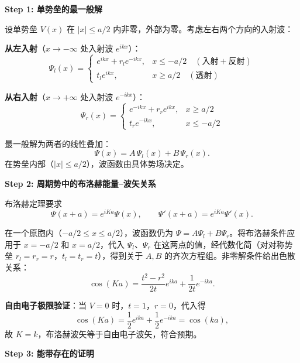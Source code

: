 \begin{derivationbox}[标准解题过程]
\textbf{Step 1: 单势垒的最一般解}

设单势垒 $V(x)$ 在 $|x|\le a/2$ 内非零，外部为零。考虑左右两个方向的入射波：

\textbf{从左入射}（$x\to-\infty$ 处入射波 $e^{ikx}$）：
\begin{equation}
\Psi_l(x)=\begin{cases}
e^{ikx}+r_l e^{-ikx}, & x\le -a/2 \quad(\text{入射}+\text{反射})\\
t_l e^{ikx}, & x\ge a/2 \quad(\text{透射})
\end{cases}
\end{equation}

\textbf{从右入射}（$x\to+\infty$ 处入射波 $e^{-ikx}$）：
\begin{equation}
\Psi_r(x)=\begin{cases}
e^{-ikx}+r_r e^{ikx}, & x\ge a/2 \\
t_r e^{-ikx}, & x\le -a/2
\end{cases}
\end{equation}

最一般解为两者的线性叠加：
\begin{equation}
\boxed{\Psi(x)=A\,\Psi_l(x)+B\,\Psi_r(x).}
\end{equation}
在势垒内部（$|x|\le a/2$），波函数由具体势场决定。

\textbf{Step 2: 周期势中的布洛赫能量--波矢关系}

布洛赫定理要求
\begin{equation}
\Psi(x+a)=e^{iKa}\Psi(x),\qquad \Psi'(x+a)=e^{iKa}\Psi'(x).
\end{equation}

在一个原胞内（$-a/2\le x\le a/2$），波函数仍为 $\Psi=A\Psi_l+B\Psi_r$。将布洛赫条件应用于 $x=-a/2$ 和 $x=a/2$，代入 $\Psi_l$、$\Psi_r$ 在这两点的值，经代数化简（对对称势垒 $r_l=r_r=r$，$t_l=t_r=t$），得到关于 $A,B$ 的齐次方程组。非零解条件给出色散关系：
\begin{equation}
\boxed{\cos(Ka)=\frac{t^2-r^2}{2t}e^{ika}+\frac{1}{2t}e^{-ika}.}
\end{equation}

\textbf{自由电子极限验证}：当 $V=0$ 时，$t=1$，$r=0$，代入得
\begin{equation}
\cos(Ka)=\frac{1}{2}e^{ika}+\frac{1}{2}e^{-ika}=\cos(ka),
\end{equation}
故 $K=k$，布洛赫波矢等于自由电子波矢，符合预期。

\textbf{Step 3: 能带存在的证明}


\end{derivationbox}

